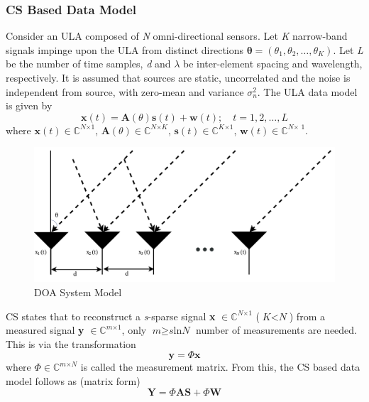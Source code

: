 \documentclass[12pt,a4paper]{article}
\theoremstyle{plain}
\theoremstyle{definition}
\begin{document}
\subsubsection{CS Based Data Model}
Consider an ULA composed of \textit{N} omni-directional sensors. Let \textit{K} narrow-band signals impinge upon the ULA from distinct directions  \(\bm{\theta}=(\theta_1, \theta_2, \hdots, \theta_{\textit{K}}) \). Let \textit{L} be the number of time samples, \textit{d} and $\lambda$ be inter-element spacing and wavelength, respectively. It is assumed that sources are static, uncorrelated and the noise is independent from source, with zero-mean and variance $\sigma_n^2$. The ULA data model is given by
\begin{equation}\label{eq:a1}
\textbf{x}(t) = \textbf{A}(\textbf{$\theta$})\textbf{s}(t) + \textbf{w}(t);\quad \textit{t} = 1, 2, \hdots, \textit{L}
\end{equation}
where $\textbf{x}(t) \in \displaystyle\mathbb{C}^{\textit{N$\times$1}}$, $\textbf{A}(\textbf{$\theta$}) \in \displaystyle\mathbb{C}^{\textit{N$\times$K}}$, $\textbf{s}(t)\in \displaystyle\mathbb{C}^{\textit{K$\times$1}}$, $\textbf{w}(t)\in \displaystyle\mathbb{C}^{\textit{N$\times$ 1}}$.
\begin{figure}[h]
\centering
\includegraphics[width=90 mm]{figs/ULA_Poster.pdf}
\caption{DOA System Model}
\label{figa1}
\end{figure}
CS states that to reconstruct a \textit{s}-sparse signal \textbf{x}  $\in \displaystyle\mathbb{C}^{\textit{N$\times${1}}}$ (\(\textit{K} < \textit{N}\)) from  a measured signal \textbf{y}  $\in \displaystyle\mathbb{C}^{\textit{m$\times${1}}}$, only \(\textit{m} \geq \textit{s}\text{ln}\textit{N}\) number of measurements are needed. 
This is via the transformation
\begin{equation}\label{eq:a2}
\textbf{y} = \textbf{$\Phi$}\textbf{x}
\end{equation}
\noindent where $\Phi \in \displaystyle\mathbb{C}^{\textit{m$\times${N}}}$ is called the measurement matrix. From this, the CS based data model follows as (matrix form)
\begin{equation}\label{eq:a3}
\textbf{Y} = \Phi\textbf{A}\textbf{S} + \Phi\textbf{W}
\end{equation}
\end{document}
